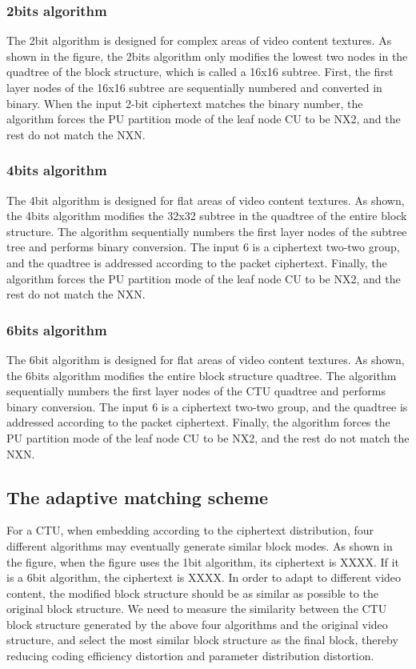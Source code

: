 \documentclass[journal,sort]{IEEEtran}
\begin{document}
\subsubsection{2bits algorithm}
The 2bit algorithm is designed for complex areas of video content textures. As shown in the figure, the 2bits algorithm only modifies the lowest two nodes in the quadtree of the block structure, which is called a 16x16 subtree. First, the first layer nodes of the 16x16 subtree are sequentially numbered and converted in binary. When the input 2-bit ciphertext matches the binary number, the algorithm forces the PU partition mode of the leaf node CU to be NX2, and the rest do not match the NXN.
\subsubsection{4bits algorithm}
The 4bit algorithm is designed for flat areas of video content textures. As shown, the 4bits algorithm modifies the 32x32 subtree in the quadtree of the entire block structure. The algorithm sequentially numbers the first layer nodes of the subtree tree and performs binary conversion. The input 6 is a ciphertext two-two group, and the quadtree is addressed according to the packet ciphertext. Finally, the algorithm forces the PU partition mode of the leaf node CU to be NX2, and the rest do not match the NXN.
\subsubsection{6bits algorithm}
The 6bit algorithm is designed for flat areas of video content textures. As shown, the 6bits algorithm modifies the entire block structure quadtree. The algorithm sequentially numbers the first layer nodes of the CTU quadtree and performs binary conversion. The input 6 is a ciphertext two-two group, and the quadtree is addressed according to the packet ciphertext. Finally, the algorithm forces the PU partition mode of the leaf node CU to be NX2, and the rest do not match the NXN.
\subsection{The adaptive matching scheme}
For a CTU, when embedding according to the ciphertext distribution, four different algorithms may eventually generate similar block modes. As shown in the figure, when the figure uses the 1bit algorithm, its ciphertext is XXXX. If it is a 6bit algorithm, the ciphertext is XXXX. In order to adapt to different video content, the modified block structure should be as similar as possible to the original block structure. We need to measure the similarity between the CTU block structure generated by the above four algorithms and the original video structure, and select the most similar block structure as the final block, thereby reducing coding efficiency distortion and parameter distribution distortion.
\end{document}

